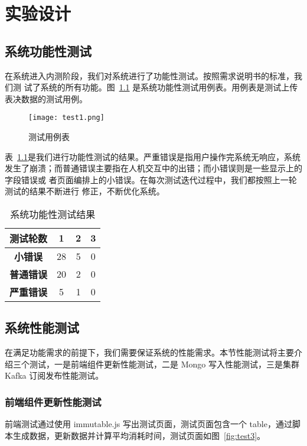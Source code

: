 
\chapter{实验设计}

\section{系统功能性测试}
在系统进入内测阶段，我们对系统进行了功能性测试。按照需求说明书的标准，我们测
试了系统的所有功能。图~\ref{fig:test1} 是系统功能性测试用例表。用例表是测试上传表决数据的测试用例。

\begin{figure}[!htp]
    \centering
    \texttt{[image: test1.png]}
    \caption{测试用例表}
    \label{fig:test1}
  \end{figure}

  表~\ref{fig:test2}是我们进行功能性测试的结果。严重错误是指用户操作完系统无响应，系统发生了崩溃；而普通错误主要指在人机交互中的出错；而小错误则是一些显示上的字段错误或
  者页面编排上的小错误。在每次测试迭代过程中，我们都按照上一轮测试的结果不断进行
  修正，不断优化系统。

  \begin{table}[h!]
    \begin{center}
      \caption{系统功能性测试结果}
      \label{fig:test2}
      \begin{tabular}{ c c c c }
        \hline
        \textbf{测试轮数} & 1 & 2 & 3 \\
        \hline
        \textbf{小错误} & 28 & 5 & 0 \\
        \textbf{普通错误} & 20 & 2 & 0 \\
        \textbf{严重错误} & 5 & 1 & 0 \\
        \hline
      \end{tabular}
    \end{center}
  \end{table}

\section{系统性能测试}
在满足功能需求的前提下，我们需要保证系统的性能需求。本节性能测试将主要介绍三个测试，一是前端组件更新性能测试，二是 Mongo 写入性能测试，三是集群 Kafka 订阅发布性能测试。

\subsection{前端组件更新性能测试}
前端测试通过使用 immutable.js 写出测试页面，测试页面包含一个 table，通过脚本生成数据，更新数据并计算平均消耗时间，测试页面如图~\ref{fig:test3}。

